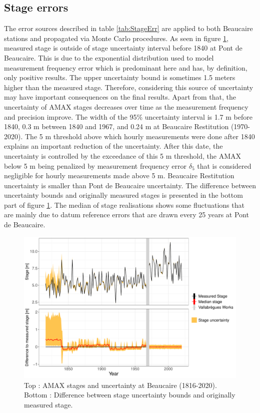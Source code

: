 \documentclass[11pt]{article}
\begin{document}
    \subsection{Stage errors}
    \label{sec:StageErrRes}
    
    The error sources described in table \ref{tab:StageErr} are applied to both Beaucaire stations and propagated via Monte Carlo procedures. As seen in figure \ref{fig:StageErrAMAX}, measured stage is outside of stage uncertainty interval before 1840 at Pont de Beaucaire. This is due to the exponential distribution used to model measurement frequency error which is predominant here and has, by definition, only positive results. The upper uncertainty bound is sometimes 1.5 meters higher than the measured stage. Therefore, considering this source of uncertainty may have important consequences on the final results. Apart from that, the uncertainty of AMAX stages decreases over time as the measurement frequency and precision improve. The width of the 95\% uncertainty interval is 1.7 m before 1840, 0.3 m between 1840 and 1967, and 0.24 m at Beaucaire Restitution (1970-2020). The 5 m threshold above which hourly measurements were done after 1840 explains an important reduction of the uncertainty. After this date, the uncertainty is controlled by the exceedance of this 5 m threshold, the AMAX below 5 m being penalized by measurement frequency error $\delta_5$ that is considered negligible for hourly measurements made above 5 m. Beaucaire Restitution uncertainty is smaller than Pont de Beaucaire uncertainty. The difference between uncertainty bounds and originally measured stages is presented in the bottom part of figure \ref{fig:StageErrAMAX}. The median of stage realisations shows some fluctuations that are mainly due to datum reference errors that are drawn every 25 years at Pont de Beaucaire.
    
    \begin{figure}[h!]
        \centering
        \includegraphics[width=0.9\linewidth]{Figs/8-StageErrorAMAX_BOTH.pdf}\hfill
        \caption{Top : AMAX stages and uncertainty at Beaucaire (1816-2020). Bottom : Difference between stage uncertainty bounds and originally measured stage.}
        \label{fig:StageErrAMAX}
    \end{figure}
  
\end{document}
